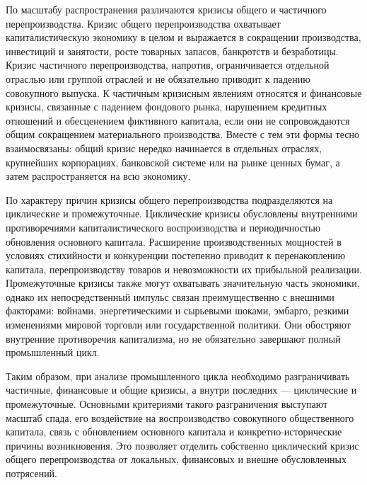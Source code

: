 По масштабу распространения различаются кризисы общего и частичного перепроизводства. Кризис общего перепроизводства охватывает капиталистическую экономику в целом и выражается в сокращении производства, инвестиций и занятости, росте товарных запасов, банкротств и безработицы. Кризис частичного перепроизводства, напротив, ограничивается отдельной отраслью или группой отраслей и не обязательно приводит к падению совокупного выпуска. К частичным кризисным явлениям относятся и финансовые кризисы, связанные с падением фондового рынка, нарушением кредитных отношений и обесценением фиктивного капитала, если они не сопровождаются общим сокращением материального производства. Вместе с тем эти формы тесно взаимосвязаны: общий кризис нередко начинается в отдельных отраслях, крупнейших корпорациях, банковской системе или на рынке ценных бумаг, а затем распространяется на всю экономику.

По характеру причин кризисы общего перепроизводства подразделяются на циклические и промежуточные. Циклические кризисы обусловлены внутренними противоречиями капиталистического воспроизводства и периодичностью обновления основного капитала. Расширение производственных мощностей в условиях стихийности и конкуренции постепенно приводит к перенакоплению капитала, перепроизводству товаров и невозможности их прибыльной реализации. Промежуточные кризисы также могут охватывать значительную часть экономики, однако их непосредственный импульс связан преимущественно с внешними факторами: войнами, энергетическими и сырьевыми шоками, эмбарго, резкими изменениями мировой торговли или государственной политики. Они обостряют внутренние противоречия капитализма, но не обязательно завершают полный промышленный цикл.

Таким образом, при анализе промышленного цикла необходимо разграничивать частичные, финансовые и общие кризисы, а внутри последних — циклические и промежуточные. Основными критериями такого разграничения выступают масштаб спада, его воздействие на воспроизводство совокупного общественного капитала, связь с обновлением основного капитала и конкретно-исторические причины возникновения. Это позволяет отделить собственно циклический кризис общего перепроизводства от локальных, финансовых и внешне обусловленных потрясений.

